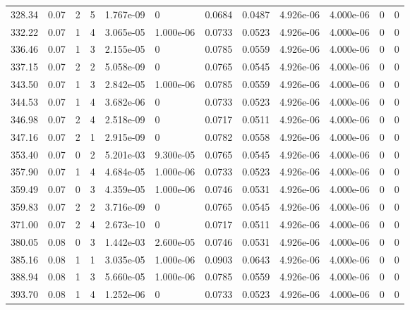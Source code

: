 \documentclass[preview]{standalone}
\begin{document}
{{{{\begin{tabular}{L{1.2cm}C{1.2cm} C{0.3cm}C{0.5cm} C{1.4cm}C{1.4cm} C{1.4cm}C{1.4cm} C{1.6cm}C{1.6cm} C{1.6cm}C{1.6cm}}
  328.34  &  0.07  & 2     &  5 &  1.767e-09  & 0  &  0.0684&   0.0487& 4.926e-06 & 4.000e-06   &  0 & 0  \\ 
  332.22  &  0.07  & 1     &  4 &  3.065e-05  & 1.000e-06  &  0.0733&   0.0523& 4.926e-06 & 4.000e-06   &  0 & 0  \\ 
  336.46  &  0.07  & 1     &  3 &  2.155e-05  & 0  &  0.0785&   0.0559& 4.926e-06 & 4.000e-06   &  0 & 0  \\ 
  337.15  &  0.07  & 2     &  2 &  5.058e-09  & 0  &  0.0765&   0.0545& 4.926e-06 & 4.000e-06   &  0 & 0  \\ 
  343.50  &  0.07  & 1     &  3 &  2.842e-05  & 1.000e-06  &  0.0785&   0.0559& 4.926e-06 & 4.000e-06   &  0 & 0  \\ 
  344.53  &  0.07  & 1     &  4 &  3.682e-06  & 0  &  0.0733&   0.0523& 4.926e-06 & 4.000e-06   &  0 & 0  \\ 
  346.98  &  0.07  & 2     &  4 &  2.518e-09  & 0  &  0.0717&   0.0511& 4.926e-06 & 4.000e-06   &  0 & 0  \\ 
  347.16  &  0.07  & 2     &  1 &  2.915e-09  & 0  &  0.0782&   0.0558& 4.926e-06 & 4.000e-06   &  0 & 0  \\ 
  353.40  &  0.07  & 0     &  2 &  5.201e-03  & 9.300e-05  &  0.0765&   0.0545& 4.926e-06 & 4.000e-06   &  0 & 0  \\ 
  357.90  &  0.07  & 1     &  4 &  4.684e-05  & 1.000e-06  &  0.0733&   0.0523& 4.926e-06 & 4.000e-06   &  0 & 0  \\ 
  359.49  &  0.07  & 0     &  3 &  4.359e-05  & 1.000e-06  &  0.0746&   0.0531& 4.926e-06 & 4.000e-06   &  0 & 0  \\ 
  359.83  &  0.07  & 2     &  2 &  3.716e-09  & 0  &  0.0765&   0.0545& 4.926e-06 & 4.000e-06   &  0 & 0  \\ 
  371.00  &  0.07  & 2     &  4 &  2.673e-10  & 0  &  0.0717&   0.0511& 4.926e-06 & 4.000e-06   &  0 & 0  \\ 
  380.05  &  0.08  & 0     &  3 &  1.442e-03  & 2.600e-05  &  0.0746&   0.0531& 4.926e-06 & 4.000e-06   &  0 & 0  \\ 
  385.16  &  0.08  & 1     &  1 &  3.035e-05  & 1.000e-06  &  0.0903&   0.0643& 4.926e-06 & 4.000e-06   &  0 & 0  \\ 
  388.94  &  0.08  & 1     &  3 &  5.660e-05  & 1.000e-06  &  0.0785&   0.0559& 4.926e-06 & 4.000e-06   &  0 & 0  \\ 
  393.70  &  0.08  & 1     &  4 &  1.252e-06  & 0  &  0.0733&   0.0523& 4.926e-06 & 4.000e-06   &  0 & 0  \\ 

\end{tabular}}}}}
\end{document}
